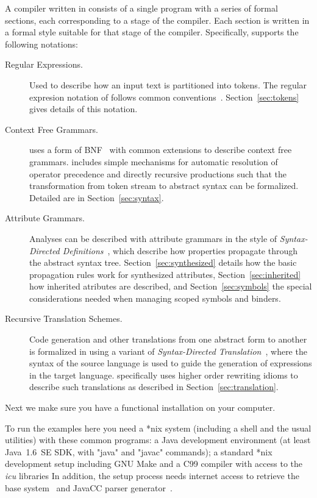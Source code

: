 \documentclass[11pt]{article} %
\begin{document}
A compiler written in \HAX consists of a single program with a series of formal sections, each
corresponding to a stage of the compiler.  Each section is written in a formal style suitable for
that stage of the compiler. Specifically, \HAX supports the following notations:
\begin{description}

\item[Regular Expressions.] Used to describe how an input text is partitioned into tokens. The
  regular expresion notation of \HAX follows common
  conventions~\cite{Aho+:2006}. Section~\ref{sec:tokens} gives details of this notation.

\item[Context Free Grammars.] \HAX uses a form of BNF~\cite{NaurEtal:cacm1960} with common
  extensions to describe context free grammars. \HAX includes simple mechanisms for automatic
  resolution of operator precedence and directly recursive productions such that the transformation
  from token stream to abstract syntax can be formalized.  Detailed are in Section~\ref{sec:syntax}.

\item[Attribute Grammars.] Analyses can be described with attribute grammars in the style of
  \emph{Syntax-Directed Definitions}~\cite{Aho+:2006}, which describe how properties propagate
  through the abstract syntax tree.  Section~\ref{sec:synthesized} details how the basic propagation
  rules work for synthesized attributes, Section~\ref{sec:inherited} how inherited atributes are
  described, and Section~\ref{sec:symbols} the special considerations needed when managing scoped
  symbols and binders.

\item[Recursive Translation Schemes.] Code generation and other translations from one abstract form
  to another is formalized in \HAX using a variant of \emph{Syntax-Directed
    Translation}~\cite{Aho+:2006}, where the syntax of the source language is used to guide the
  generation of expressions in the target language. \HAX specifically uses higher order rewriting
  idioms to describe such translations as described in Section~\ref{sec:translation}.

\end{description}

Next we make sure you have a functional \HAX installation on your computer.

\begin{requirements}
  To run the \HAX examples here you need a *nix system (including a shell and the usual utilities)
  with these common programs: a Java development environment (at least Java~1.6~SE SDK, with "java"
  and "javac" commands); a standard *nix development setup including GNU Make and a C99 compiler
  with access to the \emph{icu} libraries In addition, the setup process needs internet access to
  retrieve the \CRSX base system~\cite{crsx} and JavaCC parser generator~\cite{javacc}.
\end{requirements}
\end{document}
